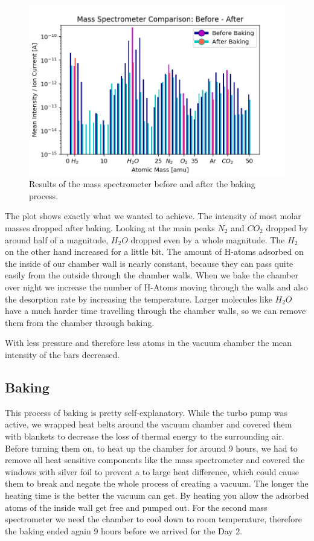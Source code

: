 \documentclass[]{article}
\begin{document}
\begin{figure}[h]
\centering\includegraphics[width=1\textwidth]{Plots/BeforeAfter.png}
\caption{Results of the mass spectrometer before and after the baking process.}
\label{fig::BeforeAfter}
\end{figure}

The plot shows exactly what we wanted to achieve. The intensity of most molar masses dropped after baking. Looking at the main peaks $N_2$ and $CO_2$ dropped by around half of a magnitude,  $H_2O$ dropped even by a whole magnitude. The $H_2$ on the other hand increased for a little bit. The amount of H-atoms adsorbed on the inside of our chamber wall is nearly constant, because they can pass quite easily from the outside through the chamber walls. When we bake the chamber over night we increase the number of H-Atoms moving through the walls and also the desorption rate by increasing the temperature. Larger molecules like $H_{2}O$ have a much harder time travelling through the chamber walls, so we can remove them from the chamber through baking.

With less pressure and therefore less atoms in the vacuum chamber the mean intensity of the bars decreased. 

\subsection{Baking}
This process of baking is pretty self-explanatory. While the turbo pump was active, we wrapped heat belts around the vacuum chamber and covered them with blankets to decrease the loss of thermal energy to the surrounding air. Before turning them on, to heat up the chamber for around 9 hours, we had to remove all heat sensitive components like the mass spectrometer and covered the windows with silver foil to prevent a to large heat difference, which could cause them to break and negate the whole process of creating a vacuum.
The longer the heating time is the better the vacuum can get. By heating you allow the adsorbed atoms of the inside wall get free and pumped out. 
For the second mass spectrometer we need the chamber to cool down to room temperature, therefore the baking ended again 9 hours before we arrived for the Day 2.
\end{document}
